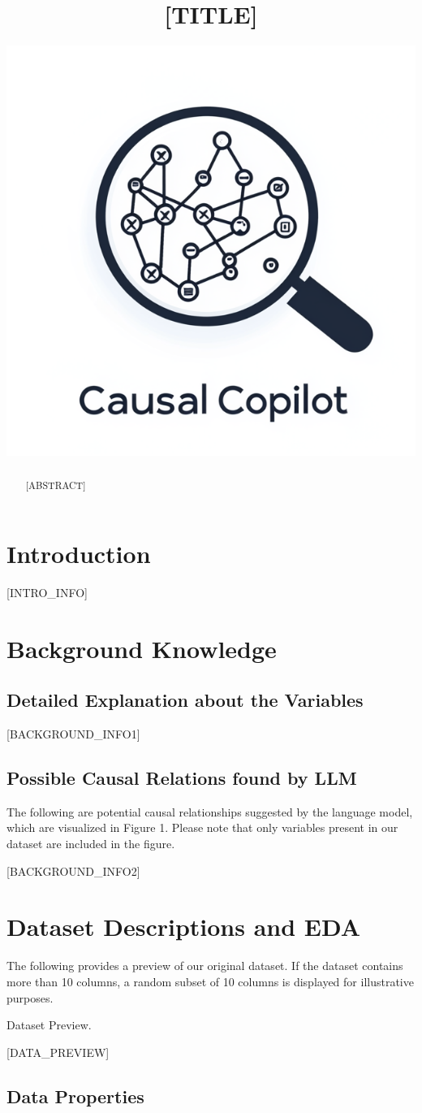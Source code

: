 \documentclass{article}
\title{[TITLE]}
\author{ \href{https://github.com/Lancelot39/Causal-Copilot/tree/main}{\includegraphics[scale=0.06]{asset/logo.png}} }
\begin{document}
\maketitle

\begin{abstract}
[ABSTRACT]
\end{abstract}


\raggedbottom
\section{Introduction}
[INTRO_INFO]

\section{Background Knowledge}
\subsection{Detailed Explanation about the Variables}
[BACKGROUND_INFO1]

\subsection{Possible Causal Relations found by LLM}

The following are potential causal relationships suggested by the language model, which are visualized in Figure 1. Please note that only variables present in our dataset are included in the figure.

[BACKGROUND_INFO2]

\section{Dataset Descriptions and EDA}
The following provides a preview of our original dataset. If the dataset contains more than 10 columns, a random subset of 10 columns is displayed for illustrative purposes.

\begin{table}[H]
    \centering
    \caption{Dataset Preview.}
    [DATA_PREVIEW]
\end{table}

\subsection{Data Properties}
\end{document}
